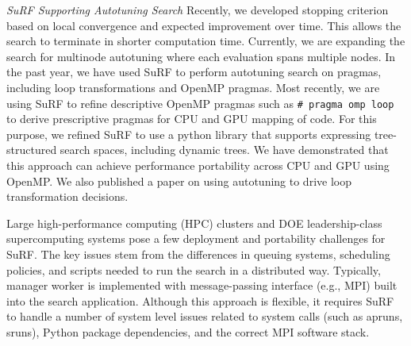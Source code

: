 \vspace*{.1in}
\noindent
\textit{SuRF Supporting Autotuning Search}
Recently, we developed stopping criterion based on local convergence and expected improvement over time. This allows the search to terminate in shorter computation time. Currently, we are expanding the search for multinode autotuning where each evaluation spans multiple nodes.
In the past year, we have used SuRF to perform autotuning search on
pragmas, including loop transformations and OpenMP pragmas. Most recently,
we are using SuRF to refine descriptive OpenMP pragmas such as \texttt{\# pragma omp loop} to derive prescriptive pragmas for CPU and GPU mapping of code.  For this purpose, we refined SuRF to use a python library that supports expressing tree-structured search spaces, including dynamic trees.  We have demonstrated that this approach can achieve performance portability across CPU and GPU using OpenMP.   We also published a paper on using autotuning to drive loop transformation decisions.


Large high-performance computing (HPC) clusters and DOE leadership-class supercomputing systems pose a few deployment and portability challenges for SuRF. The key issues stem from the differences in queuing systems, scheduling policies, and scripts needed to run the search in a distributed way. Typically, manager worker is implemented with message-passing interface (e.g., MPI) built into the search application. Although this approach is flexible, it requires SuRF to handle a number of system level issues related to system calls (such as apruns, sruns), Python package dependencies, and the correct MPI software stack.

